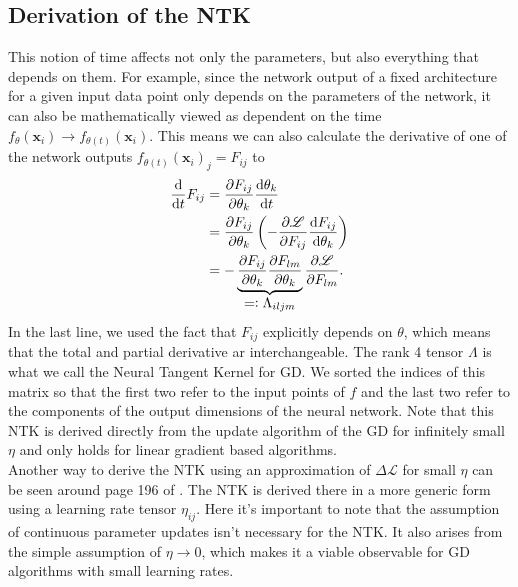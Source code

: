 \subsection{Derivation of the NTK}
This notion of time affects not only the parameters, but also everything that depends on them. For example, since the network output of a fixed architecture for a given input data point only depends on the parameters of the network, it can also be mathematically viewed as dependent on the time $f_{\theta}(\mathbf{x}_i) \rightarrow f_{\theta(t)}(\mathbf{x}_i)$. This means we can also calculate the derivative of one of the network outputs $f_{\theta(t)}(\mathbf{x}_i)_j = F_{ij}$ to
\begin{align}
	\tAbl{}{t} F_{ij} &= \pAbl{F_{ij}}{\theta_k}\tAbl{\theta_k}{t}\nonumber\\
	&= \pAbl{F_{ij}}{\theta_k} \left(- \pAbl{\mathscr{L}}{F_{ij}} \tAbl{F_{ij}}{\theta_k} \right)\label{eq:NTKarisesFromHere}\\
	&= - \underbrace{\pAbl{F_{ij}}{\theta_k} \pAbl{F_{lm}}{\theta_k}}_\mathlarger{=\vcentcolon \Lambda_{iljm}}
	\pAbl{\mathscr{L}}{F_{lm}}.\nonumber
\end{align}
In the last line, we used the fact that $F_{ij}$ explicitly depends on $\theta$, which means that the total and partial derivative ar interchangeable.
The rank 4 tensor $\Lambda$ is what we call the Neural Tangent Kernel for GD. We sorted the indices of this matrix so that the first two refer to the input points of $f$ and the last two refer to the components of the output dimensions of the neural network. Note that this NTK is derived directly from the update algorithm of the GD for infinitely small $\eta$ and only holds for linear gradient based algorithms.\\
Another way to derive the NTK using an approximation of $\Delta \mathscr{L}$ for small $\eta$ can be seen around page 196 of \cite{ThePrinciplesOfDeepLearningTheory}. The NTK is derived there in a more generic form using a learning rate tensor $\eta_{ij}$. Here it's important to note that the assumption of continuous parameter updates isn't necessary for the NTK. It also arises from the simple assumption of $\eta \rightarrow 0$, which makes it a viable observable for GD algorithms with small learning rates. 
